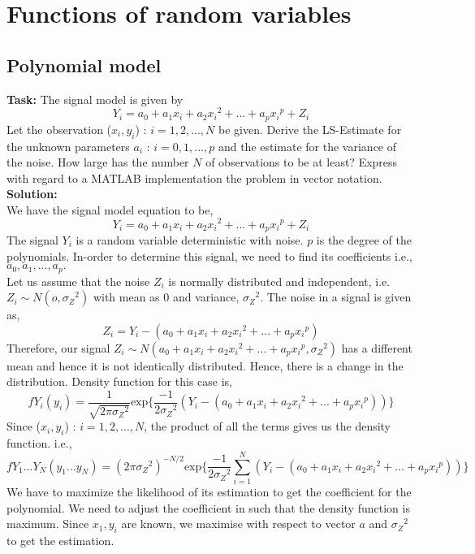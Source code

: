  \chapter{Functions of random variables }

\section{Polynomial model }
\noindent \textbf{Task:} The signal model is given by
$$ Y_i = a_0 + a_1 x_i + a_2 {x_i}^2 + ...+ a_p {x_i}^p + Z_i  $$
\noindent Let the observation ($x_i, y_i$) : $i = 1,2,...,N$ be given. Derive the LS-Estimate for the unknown parameters $a_i$ : $i = 0,1,..., p$ and the estimate for the variance of the noise. How large has the number $N$ of observations to be at least? Express with regard to a MATLAB implementation the problem in vector notation.\\
\noindent \textbf{Solution:}\\
\noindent We have the signal model equation to be,
$$ Y_i = a_0 + a_1 x_i + a_2 {x_i}^2 + ...+ a_p {x_i}^p + Z_i  $$
\noindent The signal $Y_i$ is a random variable deterministic with noise. $p$ is the degree of the polynomials. In-order to determine this signal, we need to find its coefficients i.e., $a_0, a_1,...,a_p.$\\
\noindent Let us assume that the noise $Z_i$ is normally distributed and independent, i.e. $Z_i \sim N(o, {\sigma_Z}^2) $ with mean as 0 and variance, ${\sigma_Z}^2.$ The noise in a signal is given as,
$$Z_i  = Y_i -( a_0 + a_1 x_i + a_2 {x_i}^2 + ...+ a_p {x_i}^p)  $$
\noindent Therefore, our signal $Z_i \sim N( a_0 + a_1 x_i + a_2 {x_i}^2 + ...+ a_p {x_i}^p, {\sigma_Z}^2) $ has a different mean and hence it is not identically distributed. Hence, there is a change in the distribution. Density function for this case is, 
$$ fY_i(y_i) = \frac{1}{\sqrt{2\pi{\sigma_Z}^2}} \text{exp}\Big\{ \frac{-1}{2{\sigma_Z}^2} (Y_i -( a_0 + a_1 x_i + a_2 {x_i}^2 + ...+ a_p {x_i}^p) ) \Big\}     $$
\noindent Since ($x_i, y_i$) : $i = 1,2,...,N$, the product of all the terms gives us the density function. i.e.,
$$ f{Y_1}...{Y_N}({y_1}...{y_N}) = {(2\pi{\sigma_Z}^2)}^{-N/2} \text{exp}\Big\{ \frac{-1}{2{\sigma_Z}^2}\sum_{i=1}^{N} (Y_i -( a_0 + a_1 x_i + a_2 {x_i}^2 + ...+ a_p {x_i}^p) ) \Big\}  $$
\noindent We have to maximize the likelihood of its estimation to get the coefficient for the polynomial. We need to adjust the coefficient in such that the density function is maximum. Since $x_1, y_i$ are known, we maximise with respect to vector $a$  and ${\sigma_Z}^2$ to get the estimation.\\
